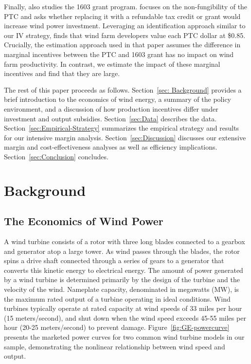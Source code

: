 \documentclass[12pt]{article}
\begin{document}
Finally, \cite{johnston_nonrefundable_2019} also studies the 1603 grant program. \citeauthor{johnston_nonrefundable_2019} focuses on the non-fungibility of the PTC and asks whether replacing it with a refundable tax credit or grant would increase wind power investment. Leveraging an identification approach similar to our IV strategy, \citeauthor{johnston_nonrefundable_2019} finds that wind farm developers value each PTC dollar at \$0.85. Crucially, the estimation approach used in that paper assumes the difference in marginal incentives between the PTC and 1603 grant has no impact on wind farm productivity. In contrast, we estimate the impact of these marginal incentives and find that they are large.

The rest of this paper proceeds as follows. Section~\ref{sec: Background} provides a brief introduction to the economics of wind energy, a summary of the policy environment, and a discussion of how production incentives differ under investment and output subsidies. Section~\ref{sec:Data} describes the data. Section~\ref{sec:Empirical-Strategy} summarizes the empirical strategy and results for our intensive margin analysis. Section~\ref{sec:Discussion} discusses our extensive margin and cost-effectiveness analyses as well as efficiency implications. Section~\ref{sec:Conclusion} concludes.

\section{Background \label{sec: Background}}

\subsection{The Economics of Wind Power \label{subsec:WindEcon}}

A wind turbine consists of a rotor with three long blades connected to a gearbox and generator atop a large tower. As wind passes through the blades, the rotor spins a drive shaft connected through a series of gears to a generator that converts this kinetic energy to electrical energy. The amount of power generated by a wind turbine is determined primarily by the design of the turbine and the velocity of the wind. Nameplate capacity, denominated in megawatts (MW), is the maximum rated output of a turbine operating in ideal conditions. Wind turbines typically operate at rated capacity at wind speeds of 33 miles per hour (15 meters/second), and shut down when the wind speed exceeds 45-55 miles per hour (20-25 meters/second) to prevent damage. Figure~\ref{fig:GE-powercurve} presents the marketed power curves for two common wind turbine models in our sample, demonstrating the nonlinear relationship between wind speed and output.
\end{document}
